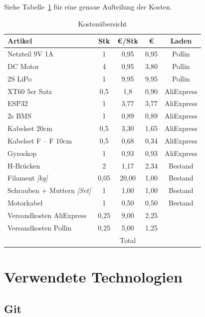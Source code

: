 Siehe Tabelle~\ref{table:Kosten} für eine genaue Aufteilung der Kosten.
\begin{table}[!ht]
	\centering
\begin{tabular}{lcccc}
	Artikel & Stk & \euro/Stk & \euro{} & Laden\\
	\midrule[2pt]
	Netzteil 9V 1A & 1 & 0,95 & 0,95 & Pollin\\
	\midrule
	DC Motor & 4 & 0,95 & 3,80 & Pollin\\
	\midrule
	2S LiPo & 1 & 9,95 & 9,95 & Pollin\\
	\midrule
	XT60 5er Satz & 0,5 & 1,8 & 0,90 & AliExpress\\
	\midrule
	ESP32 & 1 & 3,77 & 3,77 & AliExpress\\
	\midrule
	2s BMS & 1 & 0,89 & 0,89 & AliExpress\\
	\midrule
	Kabelset 20cm & 0,5 & 3,30 & 1,65 & AliExpress\\
	\midrule
	Kabelset F -- F 10cm & 0,5 & 0,68 & 0,34 & AliExpress\\
	\midrule
	Gyroskop & 1 & 0,93 & 0,93 & AliExpress\\
	\midrule
	H-Brücken & 2 & 1,17 & 2,34 & Bestand\\
	\midrule
	Filament \textit{[kg]} & 0,05 & 20,00 & 1,00 & Bestand\\
	\midrule
	Schrauben + Muttern \textit{[Set]} & 1 & 1,00 & 1,00 & Bestand\\
	\midrule
	Motorkabel & 1 & 0,50 & 0,50 & Bestand\\
	\midrule
	Versandkosten AliExpress & 0,25 & 9,00 & 2,25 & \\
	\midrule
	Versandkosten Pollin & 0,25 & 5,00 & 1,25 & \\
	\midrule
	\midrule
	 &  & Total & \EUR{31,52} & \\
\end{tabular} 
\caption{Kostenübersicht} 
\label{table:Kosten}
\end{table} 

\section{Verwendete Technologien}

\subsection{Git}


